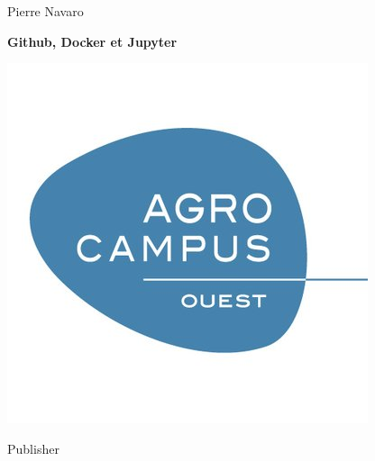
\vspace*{\baselineskip} 

\centering  
{\Large Pierre Navaro}
\vspace*{0.167\textheight} 

\raggedleft
\textbf{\fontsize{30}{36}\selectfont Github, Docker et Jupyter}

\vspace*{0.1\textheight} 

\centering
\includegraphics{images/agrocampus-logo.png}

\vfill 

{\large Publisher} 
